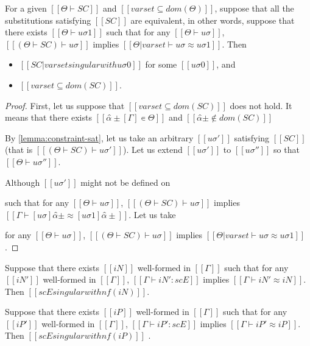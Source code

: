 \begin{lemma}
    \label{lemma:singularity-completeness}
    For a given $[[Θ ⊢ SC]]$
    and $[[varset ⊆ dom(Θ)]]$,
    suppose that all the substitutions satisfying $[[SC]]$ are equivalent,
    in other words, suppose that there exists $[[Θ ⊢ uσ1]]$ such that
    for any $[[Θ ⊢ uσ]]$, $[[(Θ  ⊢  SC) ⊢ uσ]]$ implies $[[Θ|varset ⊢ uσ ≈ uσ1]]$.
    Then 
    \begin{itemize}
        \item $[[SC|varset singular with uσ0]]$ for some $[[uσ0]]$, and
        \item $[[varset ⊆ dom(SC)]]$.
    \end{itemize} 
\end{lemma}
\begin{proof}
    First, let us suppose that $[[varset ⊆ dom(SC)]]$ does not hold.
    It means that there exists $[[ α̂±[Γ] ∊ Θ]]$ and $[[α̂± ∉ dom(SC)]]$

    By \cref{lemma:constraint-sat}, let us take an arbitrary 
    $[[uσ']]$ satisfying $[[SC]]$ (that is $[[(Θ  ⊢  SC) ⊢ uσ']]$).
    Let us extend $[[uσ']]$ to $[[uσ'']]$ so that $[[Θ ⊢ uσ'']]$.

    Although $[[uσ']]$ might not be defined on 
    
    

    such that for any $[[Θ ⊢ uσ]]$, $[[(Θ  ⊢  SC) ⊢ uσ]]$ implies 
    $[[ Γ ⊢ [uσ]α̂± ≈ [uσ1]α̂± ]]$.
    Let us take 


    for any $[[Θ ⊢ uσ]]$, $[[(Θ  ⊢  SC) ⊢ uσ]]$ implies $[[Θ|varset ⊢ uσ ≈ uσ1]]$.


\end{proof}


        \item [$-$] Suppose that there exists $[[iN]]$ well-formed in $[[Γ]]$ 
            such that for any $[[iN']]$ well-formed in $[[Γ]]$,
            $[[Γ ⊢ iN' : scE]]$ implies $[[Γ ⊢ iN' ≈ iN]]$. 
            Then $[[scE singular with nf(iN)]]$.
        \item [$+$] Suppose that there exists $[[iP]]$ well-formed in $[[Γ]]$ 
            such that for any $[[iP']]$ well-formed in $[[Γ]]$,
            $[[Γ ⊢ iP' : scE]]$ implies $[[Γ ⊢ iP' ≈ iP]]$. 
            Then $[[scE singular with nf(iP)]]$ .
